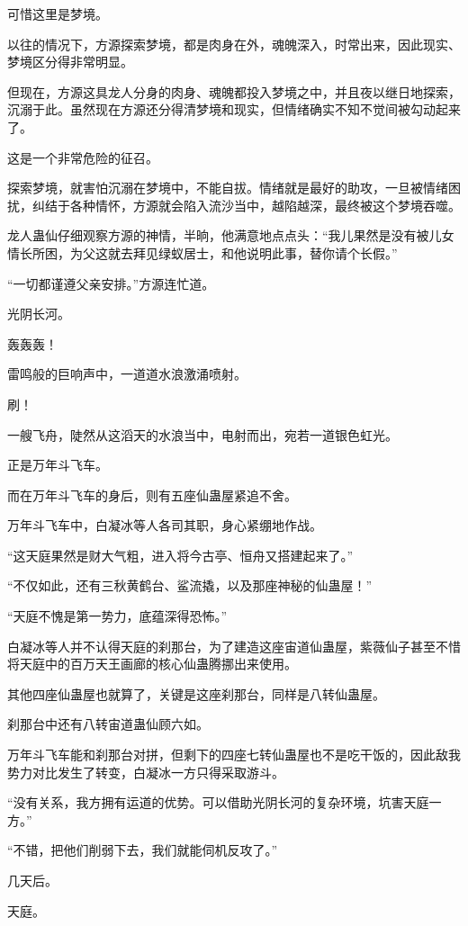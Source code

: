 \begin{this_body}
可惜这里是梦境。

以往的情况下，方源探索梦境，都是肉身在外，魂魄深入，时常出来，因此现实、梦境区分得非常明显。

但现在，方源这具龙人分身的肉身、魂魄都投入梦境之中，并且夜以继日地探索，沉溺于此。虽然现在方源还分得清梦境和现实，但情绪确实不知不觉间被勾动起来了。

这是一个非常危险的征召。

探索梦境，就害怕沉溺在梦境中，不能自拔。情绪就是最好的助攻，一旦被情绪困扰，纠结于各种情怀，方源就会陷入流沙当中，越陷越深，最终被这个梦境吞噬。

龙人蛊仙仔细观察方源的神情，半晌，他满意地点点头：“我儿果然是没有被儿女情长所困，为父这就去拜见绿蚁居士，和他说明此事，替你请个长假。”

“一切都谨遵父亲安排。”方源连忙道。

光阴长河。

轰轰轰！

雷鸣般的巨响声中，一道道水浪激涌喷射。

刷！

一艘飞舟，陡然从这滔天的水浪当中，电射而出，宛若一道银色虹光。

正是万年斗飞车。

而在万年斗飞车的身后，则有五座仙蛊屋紧追不舍。

万年斗飞车中，白凝冰等人各司其职，身心紧绷地作战。

“这天庭果然是财大气粗，进入将今古亭、恒舟又搭建起来了。”

“不仅如此，还有三秋黄鹤台、鲨流撬，以及那座神秘的仙蛊屋！”

“天庭不愧是第一势力，底蕴深得恐怖。”

白凝冰等人并不认得天庭的刹那台，为了建造这座宙道仙蛊屋，紫薇仙子甚至不惜将天庭中的百万天王画廊的核心仙蛊腾挪出来使用。

其他四座仙蛊屋也就算了，关键是这座刹那台，同样是八转仙蛊屋。

刹那台中还有八转宙道蛊仙顾六如。

万年斗飞车能和刹那台对拼，但剩下的四座七转仙蛊屋也不是吃干饭的，因此敌我势力对比发生了转变，白凝冰一方只得采取游斗。

“没有关系，我方拥有运道的优势。可以借助光阴长河的复杂环境，坑害天庭一方。”

“不错，把他们削弱下去，我们就能伺机反攻了。”

几天后。

天庭。


\end{this_body}
